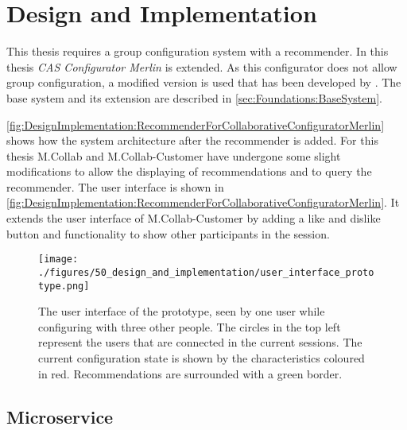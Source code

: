 \chapter{Design and Implementation}
\label{ch:DesignImplementation}

This thesis requires a group configuration system with a recommender. In this thesis \emph{CAS Configurator Merlin} \cite{IndustrySpecificProduct2020} is extended. As this configurator does not allow group configuration, a modified version is used that has been developed by \citeauthor{raabKollaborativeProduktkonfigurationEchtzeit2019} \cite{raabKollaborativeProduktkonfigurationEchtzeit2019}. The base system and its extension are described in \autoref{sec:Foundations:BaseSystem}.

\autoref{fig:DesignImplementation:RecommenderForCollaborativeConfiguratorMerlin} shows how the system architecture after the recommender is added. For this thesis M.Collab and M.Collab-Customer have undergone some slight modifications to allow the displaying of recommendations and to query the recommender. The user interface is shown in \autoref{fig:DesignImplementation:RecommenderForCollaborativeConfiguratorMerlin}. It extends the user interface of M.Collab-Customer by adding a like and dislike button  and functionality to show other participants in the session.

\begin{figure}
    \centering
    \texttt{[image: ./figures/50\_design\_and\_implementation/user\_interface\_prototype.png]}
    \caption{The user interface of the prototype, seen by one user while configuring with three other people. The circles in the top left represent the users that are connected in the current sessions. The current configuration state is shown by the characteristics coloured in red. Recommendations are surrounded with a green border.}
    \label{fig:DesignImplementation:UserInterface}
\end{figure}


\section{Microservice}
\label{sec:DesignImplementation:Microservice}

